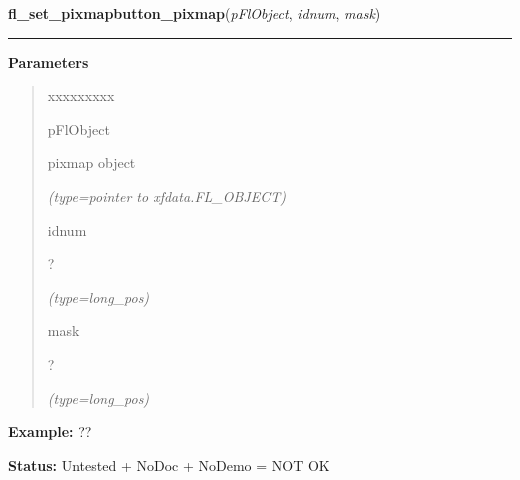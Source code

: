 \hspace{.8\funcindent}\begin{boxedminipage}{\funcwidth}

    \raggedright \textbf{fl\_set\_pixmapbutton\_pixmap}(\textit{pFlObject}, \textit{idnum}, \textit{mask})

    \vspace{-1.5ex}

    \rule{\textwidth}{0.5\fboxrule}
\setlength{\parskip}{2ex}
\setlength{\parskip}{1ex}
      \textbf{Parameters}
      \vspace{-1ex}

      \begin{quote}
        \begin{Ventry}{xxxxxxxxx}

          \item[pFlObject]

          pixmap object

            {\it (type=pointer to xfdata.FL\_OBJECT)}

          \item[idnum]

          ?

            {\it (type=long\_pos)}

          \item[mask]

          ?

            {\it (type=long\_pos)}

        \end{Ventry}

      \end{quote}

\textbf{Example:} ??



\textbf{Status:} Untested + NoDoc + NoDemo = NOT OK



    \end{boxedminipage}

    \label{xformslib:flbitmap:fl_set_pixmap_colorcloseness}

    \vspace{0.5ex}

